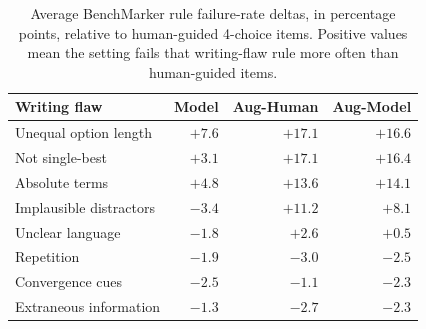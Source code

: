 \begin{table}[t]
\small
\centering
\begin{tabular}{lrrr}
\toprule
Writing flaw & Model & Aug-Human & Aug-Model \\
\midrule
Unequal option length & $+7.6$ & $+17.1$ & $+16.6$ \\
Not single-best & $+3.1$ & $+17.1$ & $+16.4$ \\
Absolute terms & $+4.8$ & $+13.6$ & $+14.1$ \\
Implausible distractors & $-3.4$ & $+11.2$ & $+8.1$ \\
Unclear language & $-1.8$ & $+2.6$ & $+0.5$ \\
Repetition & $-1.9$ & $-3.0$ & $-2.5$ \\
Convergence cues & $-2.5$ & $-1.1$ & $-2.3$ \\
Extraneous information & $-1.3$ & $-2.7$ & $-2.3$ \\
\bottomrule
\end{tabular}
\vspace{-2ex}
\caption{\small Average BenchMarker rule failure-rate deltas, in percentage points, relative to human-guided 4-choice items. Positive values mean the setting fails that writing-flaw rule more often than human-guided items.}
\label{table:benchmarker-flaw-deltas}
\vspace{-1ex}
\end{table}
